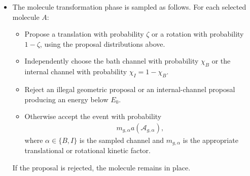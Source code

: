 \documentclass[12pt,letterpaper]{article}
\newcommand{\mb}{\mathbf}
\newcommand{\mc}{\mathcal}
\begin{document}
\begin{itemize}
\begin{align*}
\end{align*}
This form follows from viscous dissipation. Under angular velocity $\omega$, particle $i$ moves with speed $\omega\|\mb{r}_{i}-\mb{r}_{p}\|_{2}$, so the total dissipated power is proportional to
\begin{align*}
\omega^{2}\sum_{i\in A}\gamma_{i}\|\mb{r}_{i}-\mb{r}_{p}\|_{2}^{2}=\omega^{2}\Gamma_{A,p}^{\mathrm{rot}}.
\end{align*}
Rotational mobility is therefore inversely proportional to this drag. The fixed quarter-turn angle is absorbed into $\nu_{\mathrm{rot}}$. Rotation proposals are omitted for monomers. Let $m_{g,\alpha}$ denote the appropriate translational or rotational factor. Since the temperatures and drags are symmetrized between an event and its reverse, these factors change transition speeds without changing the thermodynamic forward/reverse ratio.
\item The molecule transformation phase is sampled as follows. For each selected molecule $A$:
\begin{itemize}
\item[--] Propose a translation with probability $\zeta$ or a rotation with probability $1-\zeta$, using the proposal distributions above.
\item[--] Independently choose the bath channel with probability $\chi_{B}$ or the internal channel with probability $\chi_{I}=1-\chi_{B}$.
\item[--] Reject an illegal geometric proposal or an internal-channel proposal producing an energy below $E_{0}$.
\item[--] Otherwise accept the event with probability
\begin{align*}
m_{g,\alpha}a(\mc{A}_{g,\alpha}),
\end{align*}
where $\alpha\in\{B,I\}$ is the sampled channel and $m_{g,\alpha}$ is the appropriate translational or rotational kinetic factor.
\end{itemize}
If the proposal is rejected, the molecule remains in place.

\end{itemize}
\end{document}

